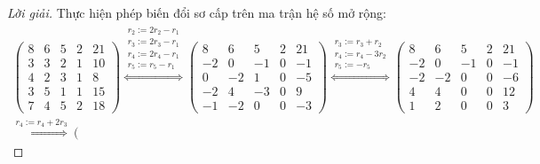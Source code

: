\begin{proof}[Lời giải]
    Thực hiện phép biến đổi sơ cấp trên ma trận hệ số mở rộng:
    \begingroup{}
    \allowdisplaybreaks{}
    \begin{gather*}
        \left(
        \begin{array}{cccc|c}
                8 & 6 & 5 & 2 & 21 \\
                3 & 3 & 2 & 1 & 10 \\
                4 & 2 & 3 & 1 & 8  \\
                3 & 5 & 1 & 1 & 15 \\
                7 & 4 & 5 & 2 & 18
            \end{array}
        \right)
        \stackrel{
            \substack{
                r_{2}:= 2r_{2} {-} r_{1} \\
                r_{3}:= 2r_{3} {-} r_{1} \\
                r_{4}:= 2r_{4} {-} r_{1} \\
                r_{5}:= r_{5} {-} r_{1}
            }
        }{\Longleftrightarrow}
        \left(\begin{array}{cccc|c}
                8  & 6  & 5  & 2 & 21 \\
                -2 & 0  & -1 & 0 & -1 \\
                0  & -2 & 1  & 0 & -5 \\
                -2 & 4  & -3 & 0 & 9  \\
                -1 & -2 & 0  & 0 & -3
            \end{array}
        \right)
        \stackrel{
        \substack{
        r_{3}:= r_{3} + r_{2} \\
        r_{4}:= r_{4} {-} 3r_{2} \\
        r_{5}:= -r_{5}
        }
        }{\Longleftrightarrow}
        \left(\begin{array}{cccc|c}
                8  & 6  & 5  & 2 & 21 \\
                -2 & 0  & -1 & 0 & -1 \\
                -2 & -2 & 0  & 0 & -6 \\
                4  & 4  & 0  & 0 & 12 \\
                1  & 2  & 0  & 0 & 3
            \end{array}
        \right) \\
        \stackrel{
            r_{4}:= r_{4} + 2r_{3}
        }{\Longleftrightarrow}
        \left(\begin{array}{cccc|c}

\end{array}
\end{gather*}
\end{proof}
